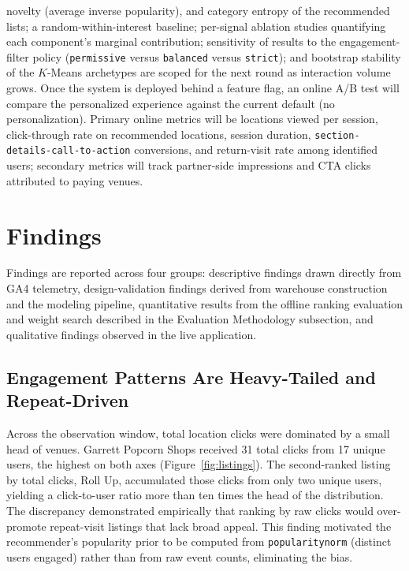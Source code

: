 \documentclass[12pt,letterpaper]{article}
\newcommand{\codeunderscore}{\discretionary{\textunderscore}{}{\textunderscore}}
\newcommand{\code}[1]{\begingroup\let\_\codeunderscore\texttt{\small #1}\endgroup}
\begin{document}
novelty (average inverse popularity), and category entropy of the
recommended lists; a random-within-interest baseline; per-signal
ablation studies quantifying each component's marginal contribution;
sensitivity of results to the engagement-filter policy
(\code{permissive} versus \code{balanced} versus \code{strict}); and
bootstrap stability of the $K$-Means archetypes are scoped for the
next round as interaction volume grows. Once the system is deployed
behind a feature
flag, an online A/B test will compare the personalized experience
against the current default (no personalization). Primary online
metrics will be locations viewed per session, click-through rate on
recommended locations, session duration,
\code{section-details-call-to-action} conversions, and return-visit
rate among identified users; secondary metrics will track
partner-side impressions and CTA clicks attributed to paying venues.

\section{Findings}\label{sec:findings}

Findings are reported across four groups: descriptive findings drawn
directly from GA4 telemetry, design-validation findings derived from
warehouse construction and the modeling pipeline, quantitative
results from the offline ranking evaluation and weight search
described in the Evaluation Methodology subsection, and qualitative findings observed in
the live application.

\subsection{Engagement Patterns Are Heavy-Tailed and Repeat-Driven}

Across the observation window, total location clicks were dominated
by a small head of venues. Garrett Popcorn Shops received 31 total
clicks from 17 unique users, the highest on both axes
(Figure~\ref{fig:listings}). The second-ranked listing by total
clicks, Roll Up, accumulated those clicks from only two unique users,
yielding a click-to-user ratio more than ten times the head of the
distribution. The discrepancy demonstrated empirically that ranking
by raw clicks would over-promote repeat-visit listings that lack
broad appeal. This finding motivated the recommender's popularity
prior to be computed from \code{popularity\_norm} (distinct users
engaged) rather than from raw event counts, eliminating the bias.
\end{document}
